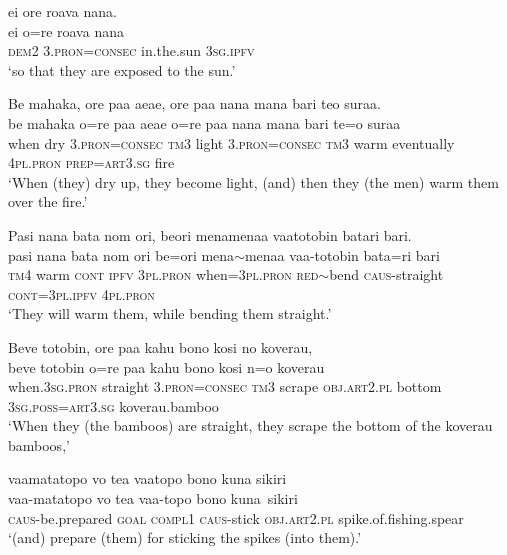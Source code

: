 \newpage
\ea\label{ex:text6-13}
ei ore roava nana.\\
\gll ei	o=re	roava	nana\\
     \textsc{dem}2	3.\textsc{pron}=\textsc{consec}	in.the.sun	3\textsc{sg}.\textsc{ipfv}\\
\glt `so that they are exposed to the sun.'
\z

\ea\label{ex:text6-14}
Be mahaka, ore paa aeae, ore paa nana mana bari teo suraa.\\
\gll be	mahaka	o=re	paa	aeae	o=re	paa	nana	mana	bari	te=o	suraa\\
     when	dry	3.\textsc{pron}=\textsc{consec}	\textsc{tm}3	light	3.\textsc{pron}=\textsc{consec}	\textsc{tm}3	warm	eventually	4\textsc{pl}.\textsc{pron}	\textsc{prep}=\textsc{art}3.\textsc{sg}	fire\\
\glt `When (they) dry up, they become light, (and) then they (the men) warm them over the fire.'
\z

\ea\label{ex:text6-15}
Pasi nana bata nom ori, beori menamenaa vaatotobin batari bari.\\
\gll pasi	nana	bata	nom	ori	be=ori	mena{$\sim$}menaa	vaa-totobin	bata=ri	bari\\
     \textsc{tm}4	warm	\textsc{cont}	\textsc{ipfv}	3\textsc{pl}.\textsc{pron}	when=3\textsc{pl}.\textsc{pron}	\textsc{red}{$\sim$}bend	\textsc{caus}-straight	\textsc{cont}=3\textsc{pl}.\textsc{ipfv}	4\textsc{pl}.\textsc{pron}\\
\glt `They will warm them, while bending them straight.'
\z

\ea\label{ex:text6-16}
Beve totobin, ore paa kahu bono kosi no koverau,\\
\gll beve	totobin	o=re	paa	kahu	bono	kosi	n=o	koverau\\
     when.3\textsc{sg}.\textsc{pron}	straight	3.\textsc{pron}=\textsc{consec}	\textsc{tm}3	scrape	\textsc{obj}.\textsc{art}2.\textsc{pl}	bottom	3\textsc{sg}.\textsc{poss}=\textsc{art}3.\textsc{sg}	koverau.bamboo\\
\glt `When they (the bamboos) are straight, they scrape the bottom of the koverau bamboos,'
\z

\ea\label{ex:text6-17}
vaamatatopo vo tea vaatopo bono kuna sikiri\\
\gll vaa-matatopo	vo	tea	vaa-topo	bono	kuna~sikiri\\
     \textsc{caus}-be.prepared	\textsc{goal}	\textsc{compl}1	\textsc{caus}-stick	\textsc{obj}.\textsc{art}2.\textsc{pl}	spike.of.fishing.spear\\
\glt `(and) prepare (them) for sticking the spikes (into them).'
\z

